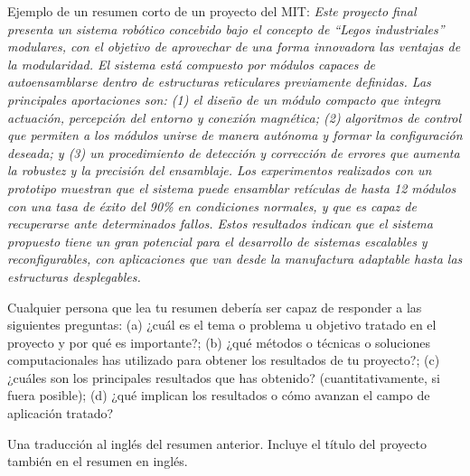 Ejemplo de un resumen corto de un proyecto del MIT: \textit{Este proyecto final presenta un sistema robótico concebido bajo el concepto de ``Legos industriales'' modulares, con el objetivo de aprovechar de una forma innovadora las ventajas de la modularidad. El sistema está compuesto por módulos capaces de autoensamblarse dentro de estructuras reticulares previamente definidas. Las principales aportaciones son: (1) el diseño de un módulo compacto que integra actuación, percepción del entorno y conexión magnética; (2) algoritmos de control que permiten a los módulos unirse de manera autónoma y formar la configuración deseada; y (3) un procedimiento de detección y corrección de errores que aumenta la robustez y la precisión del ensamblaje. Los experimentos realizados con un prototipo muestran que el sistema puede ensamblar retículas de hasta 12 módulos con una tasa de éxito del 90\% en condiciones normales, y que es capaz de recuperarse ante determinados fallos. Estos resultados indican que el sistema propuesto tiene un gran potencial para el desarrollo de sistemas escalables y reconfigurables, con aplicaciones que van desde la manufactura adaptable hasta las estructuras desplegables.}

Cualquier persona que lea tu resumen debería ser capaz de responder a las siguientes preguntas: (a) ¿cuál es el tema o problema u objetivo tratado en el proyecto y por qué es importante?; (b) ¿qué métodos o técnicas o soluciones computacionales has utilizado para obtener los resultados de tu proyecto?; (c) ¿cuáles son los principales resultados que has obtenido? (cuantitativamente, si fuera posible); (d) ¿qué implican los resultados o cómo avanzan el campo de aplicación tratado?



Una traducción al inglés del resumen anterior. Incluye el título del proyecto también en el resumen en inglés. 
